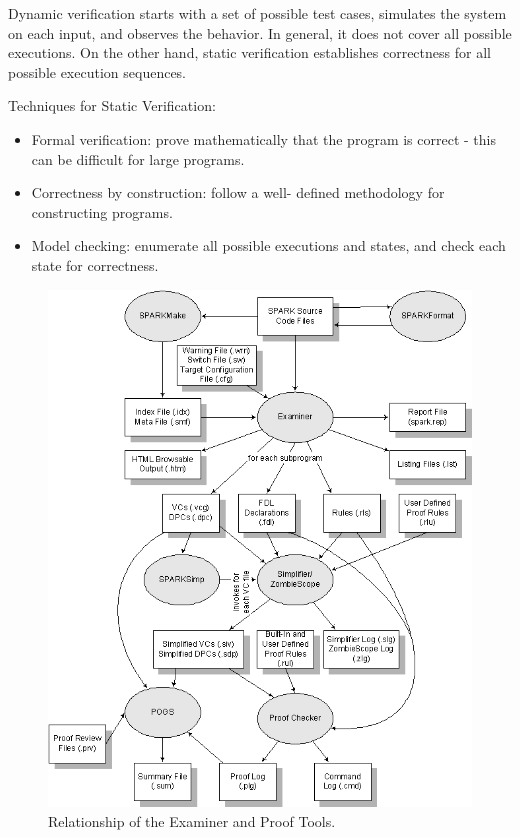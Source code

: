 Dynamic verification starts with a set of possible test cases, simulates the system on each input, and observes the behavior. In general, it does not cover all possible executions. On the other hand, static verification establishes correctness for all possible execution sequences.

Techniques for Static Verification:
\begin{itemize}
	\item Formal verification: prove mathematically that the program is correct - this can be difficult for large programs.
	\item Correctness by construction: follow a well- defined methodology for constructing programs.
	\item Model checking: enumerate all possible executions and states, and check each state for correctness.
\end{itemize}

\begin{figure}[ht]%
    \begin{center}
    	\includegraphics[height=0.6\textheight]{figures/spark-tools.png}
    	\caption{Relationship of the Examiner and Proof Tools\protect\footnotemark.}
    \end{center}
    \label{figure:spark-tools}
\end{figure}

